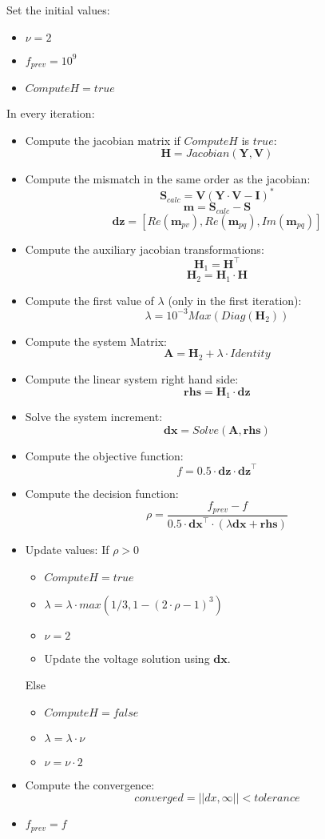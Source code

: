 \documentclass[11pt,fleqn]{book} %
\begin{document}
Set the initial values:
\begin{itemize}
	\item $\nu=2$
	\item $f_{prev} = 10^9$
	\item $ComputeH = true$
\end{itemize}

In every iteration:
\begin{itemize}
	\item Compute the jacobian matrix if $ComputeH$ is $true$: 
	$$\textbf{H} = Jacobian(\textbf{Y}, \textbf{V})$$
	\item Compute the mismatch in the same order as the jacobian:
	$$\textbf{S}_{calc} = \textbf{V} (\textbf{Y} \cdot \textbf{V} - \textbf{I})^*$$
	$$\textbf{m} = \textbf{S}_{calc} - \textbf{S}$$
	$$\textbf{dz} = [ Re(\textbf{m}_{pv}), Re(\textbf{m}_{pq}), Im(\textbf{m}_{pq})]$$
	\item Compute the auxiliary jacobian transformations:
	$$\textbf{H}_1 = \textbf{H}^\top$$
	$$\textbf{H}_2 = \textbf{H}_1 \cdot \textbf{H}$$
	\item Compute the first value of $\lambda$ (only in the first iteration): 
	$$\lambda = 10^{-3} Max(Diag(\textbf{H}_2))$$
	\item Compute the system Matrix:
	$$\textbf{A} = \textbf{H}_2 + \lambda \cdot Identity $$
	\item Compute the linear system right hand side:
	$$\textbf{rhs} = \textbf{H}_1 \cdot \textbf{dz} $$
	\item Solve the system increment:
	$$\textbf{dx} = Solve(\textbf{A}, \textbf{rhs})$$
	\item Compute the objective function:
	$$f = 0.5 \cdot \textbf{dz} \cdot \textbf{dz}^\top  $$
	\item Compute the decision function:
	$$\rho = \frac{f_{prev}-f}{0.5 \cdot \textbf{dx}^\top \cdot (\lambda \textbf{dx} + \textbf{rhs})} $$
	\item Update values: \newline
	If $\rho > 0$
	\begin{itemize}
		\item $ComputeH = true$
		\item $\lambda = \lambda \cdot max(1/3, 1- (2 \cdot \rho -1)^3)$
		\item $\nu = 2$
		\item Update the voltage solution using $\textbf{dx}$.
	\end{itemize}
	Else
	\begin{itemize}
		\item $ComputeH = false$
		\item $\lambda = \lambda \cdot \nu$
		\item $\nu = \nu \cdot 2$
	\end{itemize}
	\item Compute the convergence: 
	$$converged = ||dx, \infty|| < tolerance $$
	\item $f_{prev} = f$\newline
\end{itemize}
\end{document}
